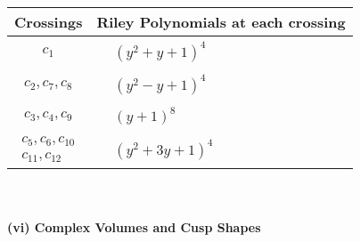 \documentclass[1p]{elsarticle_modified}
\theoremstyle{definition}
\begin{document}
\begin{tabular}{m{50pt}|m{274pt}}
Crossings & \hspace{64pt}Riley Polynomials at each crossing \\
\hline $$\begin{aligned}c_{1}\end{aligned}$$&$\begin{aligned}
&(y^2+y+1)^4
\end{aligned}$\\
\hline $$\begin{aligned}c_{2},c_{7},c_{8}\end{aligned}$$&$\begin{aligned}
&(y^2- y+1)^4
\end{aligned}$\\
\hline $$\begin{aligned}c_{3},c_{4},c_{9}\end{aligned}$$&$\begin{aligned}
&(y+1)^8
\end{aligned}$\\
\hline $$\begin{aligned}c_{5},c_{6},c_{10}\\c_{11},c_{12}\end{aligned}$$&$\begin{aligned}
&(y^2+3 y+1)^4
\end{aligned}$\\
\hline
\end{tabular}\\~\\
\newpage\flushleft \textbf{(vi) Complex Volumes and Cusp Shapes}
\end{document}
